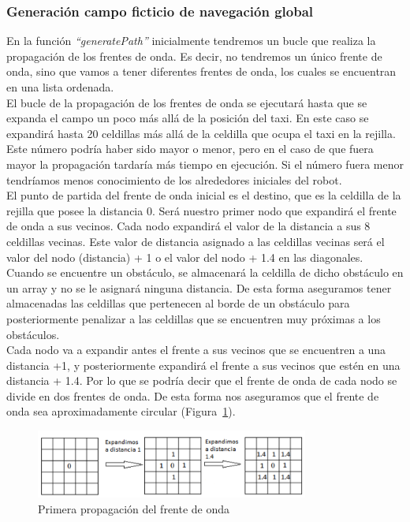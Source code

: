 \subsubsection{Generación campo ficticio de navegación global}
En la función \textit{``generatePath''} inicialmente tendremos un bucle que realiza la propagación de los frentes de onda. Es decir, no tendremos un único frente de onda, sino que vamos a tener diferentes frentes de onda, los cuales se encuentran en una lista ordenada. \\

El bucle de la propagación de los frentes de onda se ejecutará hasta que se expanda el campo un poco más allá de la posición del taxi. En este caso se expandirá hasta 20 celdillas más allá de la celdilla que ocupa el taxi en la rejilla. Este número podría haber sido mayor o menor, pero en el caso de que fuera mayor la propagación tardaría más tiempo en ejecución. Si el número fuera menor tendríamos menos conocimiento de los alrededores iniciales del robot.\\

El punto de partida del frente de onda inicial es el destino, que es la celdilla de la rejilla que posee la distancia 0. Será nuestro primer nodo que expandirá el frente de onda a sus vecinos. Cada nodo expandirá el valor de la distancia a sus 8 celdillas vecinas. Este valor de distancia asignado a las celdillas vecinas será el valor del nodo (distancia) + 1 o el valor del nodo + 1.4 en las diagonales. Cuando se encuentre un obstáculo, se almacenará la celdilla de dicho obstáculo en un array y no se le asignará ninguna distancia. De esta forma aseguramos tener almacenadas las celdillas que pertenecen al borde de un obstáculo para posteriormente penalizar a las celdillas que se encuentren muy próximas a los obstáculos.\\

Cada nodo va a expandir antes el frente a sus vecinos que se encuentren a una distancia +1, y posteriormente expandirá el frente a sus vecinos que estén en una distancia + 1.4. Por lo que se podría decir que el frente de onda de cada nodo se divide en dos frentes de onda. De esta forma nos aseguramos que el frente de onda sea aproximadamente circular (Figura~\ref{fig.primera_expansion_gpp}).

\begin{figure}[H]
  \begin{center}
    \includegraphics[width=0.8\textwidth]{figures/GPP/primera_expansion.png}
		\caption{Primera propagación del frente de onda}
		\label{fig.primera_expansion_gpp}
		\end{center}
\end{figure}

